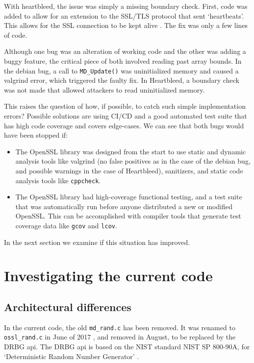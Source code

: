 \documentclass[conference]{IEEEtran}
\begin{document}
With heartbleed, the issue was simply a missing boundary
check\cite{16}. First, code was added to allow for an extension to the
SSL/TLS protocol that sent `heartbeats'. This allows for the SSL
connection to be kept alive \cite{16}. The fix was only a few lines of
code\cite{17}.

Although one bug was an alteration of working code and the other was
adding a buggy feature, the critical piece of both involved reading
past array bounds. In the debian bug, a call to \verb|MD_Update()| was
uninitialized memory and caused a valgrind error, which triggered the
faulty fix. In Heartbleed, a boundary check was not made that allowed
attackers to read uninitialized memory.

This raises the question of how, if possible, to catch such simple
implementation errors? Possible solutions are using CI/CD and a good
automated test suite that has high code coverage and covers
edge-cases. We can see that both bugs would have been stopped if:

\begin{itemize}
  \item The OpenSSL library was designed from the start to use static
    and dynamic analysis tools like valgrind (no false positives as in
    the case of the debian bug, and possible warnings in the case of
    Heartbleed), sanitizers, and static code analysis tools like \verb|cppcheck|.
  \item The OpenSSL library had high-coverage functional testing, and
    a test suite that was automatically run before anyone distributed
    a new or modified OpenSSL. This can be accomplished with compiler
    tools that generate test coverage data like \verb|gcov| and
    \verb|lcov|.
\end{itemize}

In the next section we examine if this situation has improved.

\section{Investigating the current code}

\subsection{Architectural differences}
In the current code, the old \verb|md_rand.c| has been removed. It was
renamed to \verb|ossl_rand.c| in June of 2017 \cite{13}, and removed
in August, to be replaced by the DRBG api\cite{14}. The DRBG api is
based on the NIST standard NIST SP 800-90A, for `Deterministic Random
Number Generator' \cite{10}\cite{15}.
\end{document}
